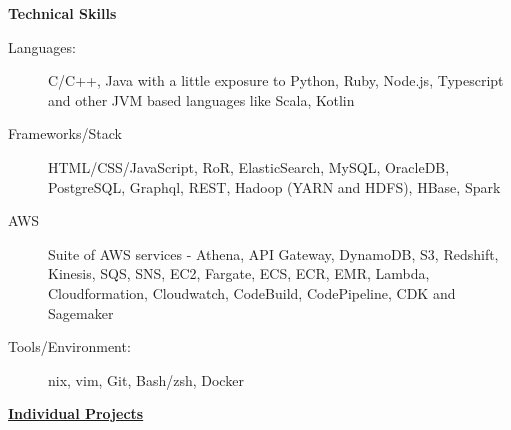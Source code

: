 \documentclass[letterpaper,11pt]{article}
\newcommand{\resheading}[1]{{\large \colorbox{mygrey}{\begin{minipage}{\textwidth}{\textbf{#1 \vphantom{p\^{E}}}}\end{minipage}}}}
\begin{document}
\resheading{{Technical Skills}}
	\begin{description}
		\item[Languages:] { \footnotesize C/C++, Java with a little exposure to Python, Ruby, Node.js, Typescript and other JVM based languages like Scala, Kotlin
		}
		\item[Frameworks/Stack] { \footnotesize HTML/CSS/JavaScript, RoR, ElasticSearch, MySQL, OracleDB, PostgreSQL, Graphql, REST, Hadoop (YARN and HDFS), HBase, Spark
		}
		\item[AWS] {\footnotesize Suite of AWS services - Athena, API Gateway, DynamoDB, S3, Redshift, Kinesis, SQS, SNS, EC2, Fargate, ECS, ECR, EMR, Lambda, Cloudformation, Cloudwatch, CodeBuild, CodePipeline, CDK and Sagemaker
		}
		\item[Tools/Environment:] {\footnotesize *nix, vim, Git, Bash/zsh, Docker
		}

	\end{description} %

\newpage

\resheading{\href{https://github.com/dtsdwarak/}{Individual Projects}}
\end{document}
